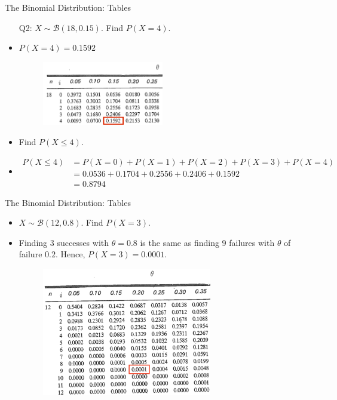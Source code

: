 \documentclass[10pt, xcolor=table]{beamer}
\begin{document}
\begin{frame}{The Binomial Distribution: Tables}
\begin{itemize}
\setlength{\itemsep}{6pt}
\item[Q2:] $X\sim \mathcal{B}(18, 0.15)$. Find $P(X = 4)$.
\item<2->[A2:] {\color{red} $P(X = 4) = 0.1592$}
\begin{figure}
\includegraphics[width = 0.5\textwidth]{images/rec2_1}
\end{figure}
\item<3->[Q3:] Find $P(X \leq 4)$.
\item<4->[A3:] {\color{red} 
\begin{align*}
P(X \leq 4) &= P(X= 0) + P(X=1)+P(X=2)+P(X=3)+P(X=4) \\
&= 0.0536 + 0.1704 + 0.2556 + 0.2406 + 0.1592 \\
&= 0.8794
\end{align*}}
\end{itemize}
\end{frame}

\begin{frame}{The Binomial Distribution: Tables}
\begin{itemize}
\setlength{\itemsep}{6pt}
\item<1->[Q2:] $X\sim \mathcal{B}(12, 0.8)$. Find $P(X = 3)$.
\item<2->[A2:] \color{red} Finding 3 successes with $\theta = 0.8$ is the same as finding 9 failures with $\theta$ of failure $0.2$. Hence, $P(X = 3) = 0.0001$.
\begin{figure}
\includegraphics[width = 0.7\textwidth]{images/rec2_2}
\end{figure}
\end{itemize}
\end{frame}
\end{document}
